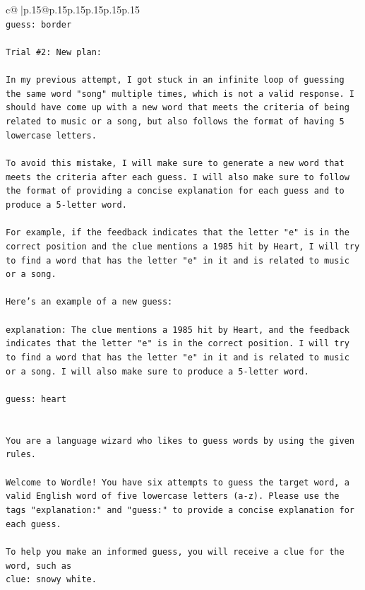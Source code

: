\documentclass{article}
\begin{document}
{\begin{supertabular}{c@{$\;$}|p{.15\linewidth}@{}p{.15\linewidth}p{.15\linewidth}p{.15\linewidth}p{.15\linewidth}p{.15\linewidth}}
{{{\\ 
\texttt{guess: border} \\
\\ 
\texttt{Trial \#2: New plan: } \\
\\ 
\texttt{In my previous attempt, I got stuck in an infinite loop of guessing the same word "song" multiple times, which is not a valid response. I should have come up with a new word that meets the criteria of being related to music or a song, but also follows the format of having 5 lowercase letters. } \\
\\ 
\texttt{To avoid this mistake, I will make sure to generate a new word that meets the criteria after each guess. I will also make sure to follow the format of providing a concise explanation for each guess and to produce a 5{-}letter word. } \\
\\ 
\texttt{For example, if the feedback indicates that the letter "e" is in the correct position and the clue mentions a 1985 hit by Heart, I will try to find a word that has the letter "e" in it and is related to music or a song. } \\
\\ 
\texttt{Here's an example of a new guess:} \\
\\ 
\texttt{explanation: The clue mentions a 1985 hit by Heart, and the feedback indicates that the letter "e" is in the correct position. I will try to find a word that has the letter "e" in it and is related to music or a song. I will also make sure to produce a 5{-}letter word.} \\
\\ 
\texttt{guess: heart} \\
\\ 
\\ 
\texttt{You are a language wizard who likes to guess words by using the given rules.} \\
\\ 
\texttt{Welcome to Wordle! You have six attempts to guess the target word, a valid English word of five lowercase letters (a{-}z). Please use the tags "explanation:" and "guess:" to provide a concise explanation for each guess.} \\
\\ 
\texttt{To help you make an informed guess, you will receive a clue for the word, such as} \\
\texttt{clue: snowy white.} \\
}}}
\end{supertabular}}
\end{document}

